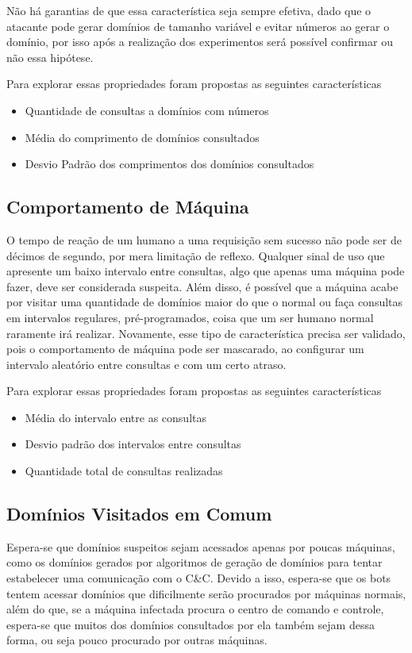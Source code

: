 Não há garantias de que essa característica seja sempre efetiva, dado que o atacante pode gerar domínios de tamanho variável e evitar números ao gerar o domínio, por isso após a realização dos experimentos será possível confirmar ou não essa hipótese.

Para explorar essas propriedades foram propostas as seguintes características 

\begin{itemize}
\item Quantidade de consultas a domínios com números 
\item Média do comprimento de domínios consultados
\item Desvio Padrão dos comprimentos dos domínios consultados
\end{itemize}

\subsection{Comportamento de Máquina}

O tempo de reação de um humano a uma requisição sem sucesso não pode ser de décimos de segundo, por mera limitação de reflexo. Qualquer sinal de uso que apresente um baixo intervalo entre consultas, algo que apenas uma máquina pode fazer, deve ser considerada suspeita. Além disso, é possível que a máquina acabe por visitar uma quantidade de domínios maior do que o normal ou faça consultas em intervalos regulares, pré-programados, coisa que um ser humano normal raramente irá realizar. Novamente, esse tipo de característica precisa ser validado, pois o comportamento de máquina pode ser mascarado, ao configurar um intervalo aleatório entre consultas e com um certo atraso.

Para explorar essas propriedades foram propostas as seguintes características 

\begin{itemize}
\item Média do intervalo entre as consultas
\item Desvio padrão dos intervalos entre consultas
\item Quantidade total de consultas realizadas
\end{itemize}

\subsection{Domínios Visitados em Comum}
Espera-se que domínios suspeitos sejam acessados apenas por poucas máquinas, como os domínios gerados por algoritmos de geração de domínios para tentar estabelecer uma comunicação com o C\&C. Devido a isso, espera-se que os bots tentem acessar domínios que dificilmente serão procurados por máquinas normais, além do que, se a máquina infectada procura o centro de comando e controle, espera-se que muitos dos domínios consultados por ela também sejam dessa forma, ou seja pouco procurado por outras máquinas.

